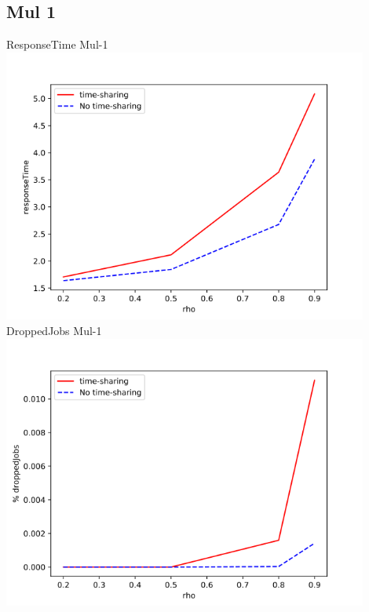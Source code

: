 \documentclass[a4paper]{article}
\begin{document}
\begin{center}
\section*{Mul 1}
ResponseTime Mul-1 \\
\includegraphics[width=0.9\textwidth]{TsVSNoTs-Mul_1-responseTime.png}
DroppedJobs Mul-1 \\
\includegraphics[width=0.9\textwidth]{TsVSNoTs-Mul_1-droppedJobs.png}
\end{center}
\end{document}
